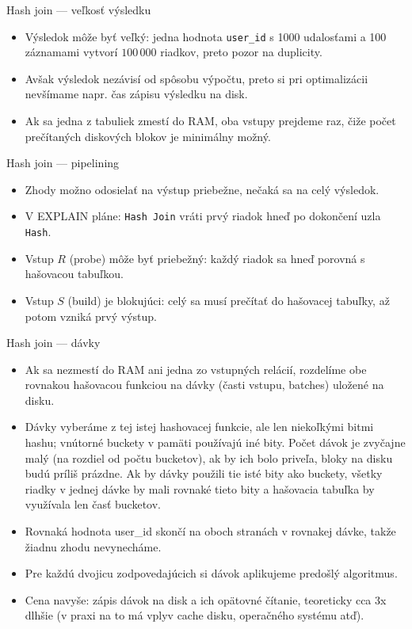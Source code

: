 \documentclass[12pt]{beamer}
\def\blue#1{\textcolor{Cerulean}{#1}}
\begin{document}
\begin{frame}{Hash join --- veľkosť výsledku}
\begin{itemize}
\item Výsledok môže byť veľký: jedna hodnota \texttt{user\_id} s 1000 udalosťami a 100 záznamami vytvorí $100\,000$ riadkov, preto pozor na duplicity.
\item Avšak výsledok nezávisí od spôsobu výpočtu, preto si pri optimalizácii nevšímame napr. čas zápisu výsledku na disk.
\item Ak sa jedna z tabuliek zmestí do RAM, oba vstupy prejdeme raz, čiže počet prečítaných diskových blokov je minimálny možný.
\end{itemize}
\end{frame}

\begin{frame}{Hash join --- pipelining}
\begin{itemize}
\item Zhody možno odosielať na výstup priebežne, nečaká sa na celý výsledok.
\item V EXPLAIN pláne: \texttt{Hash Join} vráti prvý riadok hneď po dokončení uzla \texttt{Hash}.
\item Vstup $R$ (probe) môže byť priebežný: každý riadok sa hneď porovná s hašovacou tabuľkou.
\item Vstup $S$ (build) je blokujúci: celý sa musí prečítať do hašovacej tabuľky, až potom vzniká prvý výstup.
\end{itemize}
\end{frame}

\begin{frame}{Hash join --- dávky}
\begin{itemize}
\item Ak sa nezmestí do RAM ani jedna zo vstupných relácií, rozdelíme obe \alert{rovnakou hašovacou funkciou} na \alert{dávky} (časti vstupu, batches) uložené na disku.
\item Dávky vyberáme z tej istej hashovacej funkcie, ale len niekoľkými bitmi hashu; vnútorné buckety v pamäti používajú iné bity.
Počet dávok je zvyčajne malý (na rozdiel od počtu bucketov), ak by ich bolo priveľa, bloky na disku budú príliš prázdne.
Ak by dávky použili tie isté bity ako buckety, všetky riadky v jednej dávke by mali rovnaké tieto bity a hašovacia tabuľka by využívala len časť bucketov.
\item Rovnaká hodnota \blue{user\_id} skončí na oboch stranách v rovnakej dávke, takže žiadnu zhodu nevynecháme.
\item Pre každú dvojicu zodpovedajúcich si dávok aplikujeme predošlý algoritmus.
\item \alert{Cena navyše:} zápis dávok na disk a ich opätovné čítanie, teoreticky cca 3x dlhšie (v praxi na to má vplyv cache disku, operačného systému atď).
\end{itemize}
\end{frame}
\end{document}
